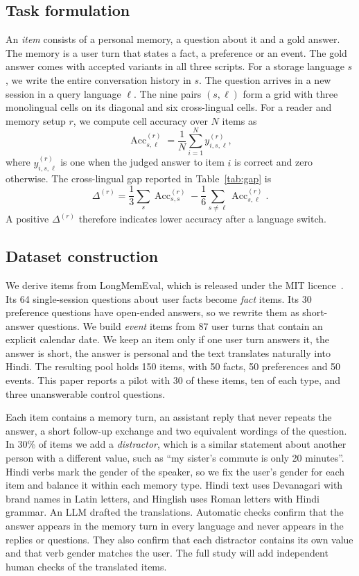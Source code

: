 \documentclass[11pt]{article}
\begin{document}
\subsection{Task formulation}
An \emph{item} consists of a personal memory, a question about it and a gold answer.
The memory is a user turn that states a fact, a preference or an event.
The gold answer comes with accepted variants in all three scripts.
For a storage language $s$, we write the entire conversation history in $s$.
The question arrives in a new session in a query language $\ell$.
The nine pairs $(s,\ell)$ form a grid with three monolingual cells on its diagonal and six cross-lingual cells.
For a reader and memory setup $r$, we compute cell accuracy over $N$ items as
\[
\operatorname{Acc}_{s,\ell}^{(r)} = \frac{1}{N}\sum_{i=1}^{N} y_{i,s,\ell}^{(r)},
\]
where $y_{i,s,\ell}^{(r)}$ is one when the judged answer to item $i$ is correct and zero otherwise. The cross-lingual gap reported in Table~\ref{tab:gap} is
\[
\Delta^{(r)}=\frac{1}{3}\sum_{s}\operatorname{Acc}_{s,s}^{(r)}-\frac{1}{6}\sum_{s\ne\ell}\operatorname{Acc}_{s,\ell}^{(r)}.
\]
A positive $\Delta^{(r)}$ therefore indicates lower accuracy after a language switch.

\subsection{Dataset construction}
We derive items from LongMemEval, which is released under the MIT licence~\citep{wu2025longmemeval}.
Its 64 single-session questions about user facts become \emph{fact} items.
Its 30 preference questions have open-ended answers, so we rewrite them as short-answer questions.
We build \emph{event} items from 87 user turns that contain an explicit calendar date.
We keep an item only if one user turn answers it, the answer is short, the answer is personal and the text translates naturally into Hindi.
The resulting pool holds 150 items, with 50 facts, 50 preferences and 50 events.
This paper reports a pilot with 30 of these items, ten of each type, and three unanswerable control questions.

Each item contains a memory turn, an assistant reply that never repeats the answer, a short follow-up exchange and two equivalent wordings of the question.
In 30\% of items we add a \emph{distractor}, which is a similar statement about another person with a different value, such as ``my sister's commute is only 20 minutes''.
Hindi verbs mark the gender of the speaker, so we fix the user's gender for each item and balance it within each memory type.
Hindi text uses Devanagari with brand names in Latin letters, and Hinglish uses Roman letters with Hindi grammar.
An LLM drafted the translations.
Automatic checks confirm that the answer appears in the memory turn in every language and never appears in the replies or questions.
They also confirm that each distractor contains its own value and that verb gender matches the user.
The full study will add independent human checks of the translated items.
\end{document}
